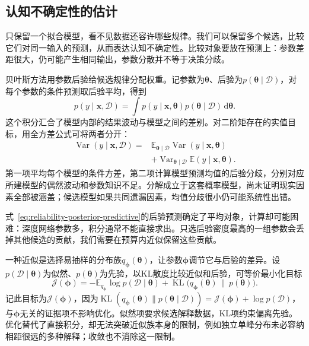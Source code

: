 \subsection{认知不确定性的估计}
\label{sec:reliability-epistemic-estimation}

只保留一个拟合模型，看不见数据还容许哪些规律。我们可以保留多个候选，比较它们对同一输入的预测，从而表达认知不确定性。比较对象要放在预测上：参数差距很大，仍可能产生相同输出，参数分散并不等于决策分歧。

贝叶斯方法用参数后验给候选规律分配权重。记参数为$\bm{\theta}$、后验为$p(\bm{\theta}\mid\mathcal D)$，对每个参数的条件预测取后验平均，得到
\begin{equation}
 p(y\mid\bm{x},\mathcal D)
 =\int p(y\mid\bm{x},\bm{\theta})
       p(\bm{\theta}\mid\mathcal D)\,\mathrm d\bm{\theta}.
 \label{eq:reliability-posterior-predictive}
\end{equation}
这个积分汇合了模型内部的结果波动与模型之间的差别。对二阶矩存在的实值目标，用全方差公式可将两者分开：
\begin{equation}
 \begin{aligned}
 \operatorname{Var}(y\mid\bm{x},\mathcal D)
 ={}&\mathbb E_{\bm{\theta}\mid\mathcal D}
       \operatorname{Var}(y\mid\bm{x},\bm{\theta})\\
 &+\operatorname{Var}_{\bm{\theta}\mid\mathcal D}
       \mathbb E(y\mid\bm{x},\bm{\theta}).
 \end{aligned}
 \label{eq:reliability-variance-decomposition}
\end{equation}
第一项平均每个模型的条件方差，第二项计算模型预测均值的后验分歧，分别对应所建模型的偶然波动和参数知识不足。分解成立于这套概率模型，尚未证明现实因素全部被涵盖；候选模型如果共同遗漏因素，均值分歧很小仍可能系统性出错。

式~\eqref{eq:reliability-posterior-predictive}的后验预测确定了平均对象，计算却可能困难：深度网络参数多，积分通常不能直接求出。只选后验密度最高的一组参数会丢掉其他候选的贡献，我们需要在预算内近似保留这些贡献。

一种近似是选择易抽样的分布族$q_{\bm{\phi}}(\bm{\theta})$，让参数$\bm{\phi}$调节它与后验的差异。设$p(\mathcal D\mid\bm{\theta})$为似然、$p(\bm{\theta})$为先验，以KL散度比较近似和后验，可等价最小化目标
\begin{equation}
 \mathcal J(\bm{\phi})
 =-\mathbb E_{q_{\bm{\phi}}}\log p(\mathcal D\mid\bm{\theta})
   +\operatorname{KL}\bigl(q_{\bm{\phi}}(\bm{\theta})
                    \,\|\,p(\bm{\theta})\bigr).
 \label{eq:reliability-variational-objective}
\end{equation}
记此目标为$\mathcal J(\bm{\phi})$，因为$\operatorname{KL}(q_{\bm{\phi}}(\bm{\theta})\|p(\bm{\theta}\mid\mathcal D))=\mathcal J(\bm{\phi})+\log p(\mathcal D)$，与$\bm{\phi}$无关的证据项不影响优化。似然项要求候选解释数据，KL项约束偏离先验。优化替代了直接积分，却无法突破近似族本身的限制，例如独立单峰分布未必容纳相距很远的多种解释；收敛也不消除这一限制。

